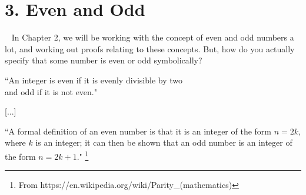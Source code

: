 \documentclass[a4paper,12pt]{book}
\begin{document}
    \newpage

    \section*{3. Even and Odd}

        \begin{intro}{\ }
            In Chapter 2, we will be working with the concept of even and
            odd numbers a lot, and working out proofs relating to these concepts.
            But, how do you actually specify that some number is even or odd symbolically?

            \begin{center}
                ``An integer is even if it is evenly divisible by two\\ and odd if it is not even."

                [...]

                ``A formal definition of an even number is that it is an integer of the form $n = 2k$,
                where $k$ is an integer;
                it can then be shown that an odd number is an integer of the form $n = 2k + 1$."
                \footnote{From https://en.wikipedia.org/wiki/Parity\_(mathematics)}
            \end{center}

        \end{intro}
\end{document}
